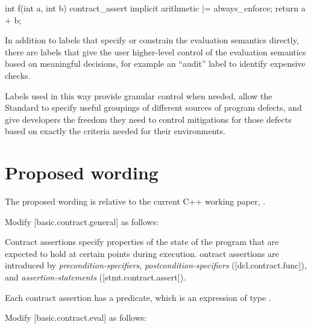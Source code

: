 \begin{codeblock}
int f(int a, int b) {
  contract_assert implicit arithmetic |= always_enforce;
  return a + b;
}
\end{codeblock}

In addition to labels that specify or constrain the evaluation semantics directly, there are labels that give the user higher-level control of the evaluation semantics based on meaningful decisions, for example an ``audit'' label to identify expensive checks.

Labels used in this way provide granular control when needed, allow the Standard to
specify useful groupings of different sources of program defects, and give developers the freedom they
need to control mitigations for those defects based on exactly the criteria needed for their environments.


\section{Proposed wording}
\label{wording}

The proposed wording is relative to the current C++ working paper, \cite{N5008}.

Modify [basic.contract.general] as follows:

\begin{adjustwidth}{0.5cm}{0.5cm}
Contract assertions specify properties of the state of the program
that are expected to hold at certain points during execution. ontract assertions
are introduced by \emph{precondition-specifiers}, \emph{postcondition-specifiers} ([dcl.contract.func]),
and \emph{assertion-statements} ([stmt.contract.assert]). 

Each contract assertion has a predicate, which is an expression of type . 
\begin{note}
\end{note}
\end{adjustwidth}

Modify [basic.contract.eval] as follows:

